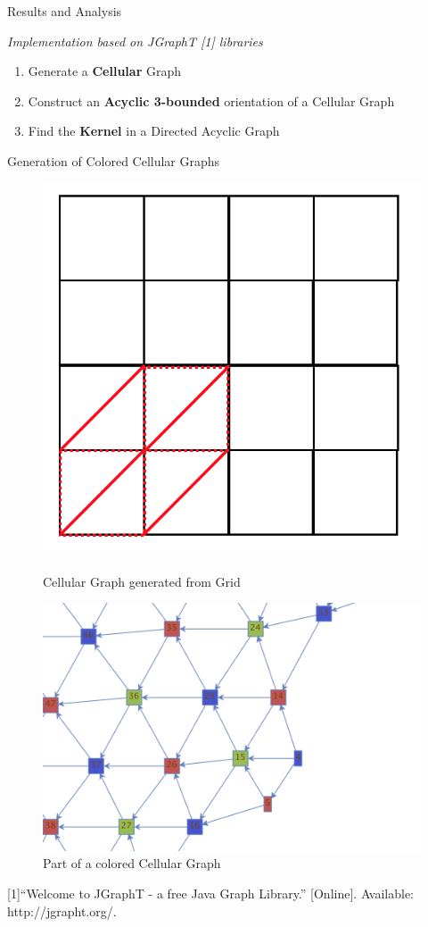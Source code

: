 \documentclass{beamer}
\begin{document}
\begin{frame}{Results and Analysis}

\small{\textit{Implementation based on JGraphT [1] libraries}}

\begin{block}{}

\begin{enumerate}
  \item Generate a \textbf{Cellular} Graph
  \item Construct an \textbf{Acyclic 3-bounded} orientation of a Cellular Graph
  \item Find the \textbf{Kernel} in a Directed Acyclic Graph
\end{enumerate}

\end{block}

\textrightarrow{}  Generation of Colored Cellular Graphs

\begin{figure}
\centering
\begin{minipage}{.5\textwidth}
  \centering
  \includegraphics[width=0.5\linewidth]{cellGeneration.png}
  \caption{Cellular Graph generated from Grid}
\end{minipage}%
\begin{minipage}{.5\textwidth}
  \centering
  \includegraphics[width=0.65\linewidth]{3colors.png}
  \caption{Part of a colored Cellular Graph}
\end{minipage}
\end{figure}

\scriptsize [1]“Welcome to JGraphT - a free Java Graph Library.” [Online]. Available: http://jgrapht.org/.
\end{frame}
\end{document}
